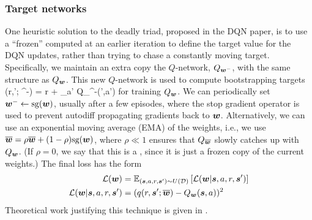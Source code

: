 \subsubsection{Target networks}
\label{sec:targetNetwork}

One heuristic solution to the deadly triad,
proposed in the DQN paper,
is to use a  ``frozen'' 
 computed at an earlier iteration
to define the target value for the DQN updates,
rather than trying to chase a constantly moving target.
Specifically, we maintain an extra copy
the $Q$-network, $Q_{\vw^-}$, 
with the same structure as $\Qapprox$.
This new $Q$-network is used
to compute bootstrapping targets
\be
\TargetV(r,\vs'; \vw^{-}) = r + \gamma \max_{a'} Q_{\vw^-}(\vs',a')
\ee
for training $\Qapprox$.
We can periodically set $\vw^{-} \assign \stopgrad(\vw)$,
usually after a few episodes,
where the stop gradient operator
is used to prevent autodiff propagating gradients back to $\vw$.
Alternatively, we can use
an exponential moving average (EMA)
of the weights,
i.e.,
we use 
 $\overline{\vw} = \rho \overline{\vw} + (1-\rho) \stopgrad(\vw)$,
where 
$\rho \ll 1$ ensures that $Q_{\overline{\vw}}$ slowly catches
up with $Q_{\vw}$.
(If $\rho=0$, we say that this is a ,
since it is just a frozen copy of the current weights.)
The final loss  has the form
  \begin{align}
    \loss(\vw) &= \expectQ{\loss(\vw|\vs,a,r,\vs')}{(\vs,a,r,\vs') \sim U(\data)} \\
      \loss(\vw|\vs,a,r,\vs') &=
  (\TargetV(r,\vs';\overline{\vw}) -   Q_{\vw}(\vs,a))^2  
  \end{align}
Theoretical work justifying this technique is given
in  \citep{Fellows2023,Che2024}.


